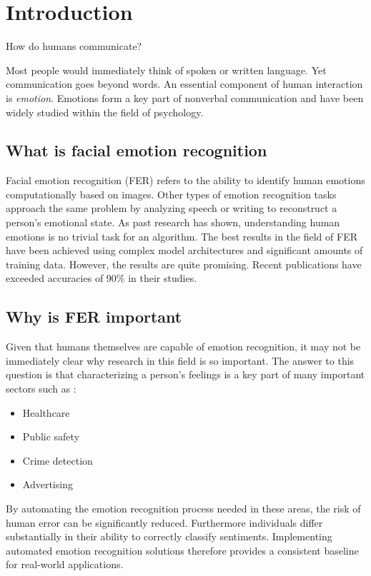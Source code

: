 \section{Introduction}
\label{sec:introduction}

How do humans communicate?

Most people would immediately think of spoken or written language. Yet communication goes beyond words.
An essential component of human interaction is \textit{emotion}. Emotions form a key part of nonverbal communication and have been
widely studied within the field of psychology.

\subsection{What is facial emotion recognition}

Facial emotion recognition (FER) refers to the ability to identify human emotions computationally based on images. Other types of emotion recognition tasks 
approach the same problem by analyzing speech or writing to reconstruct a person's emotional state. As past research has shown, understanding human emotions 
is no trivial task for an algorithm. The best results in the field of FER have been achieved using complex model architectures and significant amounts of training
data. However, the results are quite promising. Recent publications have exceeded accuracies of 90\% \cite{HSU2025112867} in their studies.

\subsection{Why is FER important}

Given that humans themselves are capable of emotion recognition, it may not be immediately clear why research in this field is so important. The answer
to this question is that characterizing a person's feelings is a key part of many important sectors such as \cite{europa}:

\begin{itemize}
    \item Healthcare
    \item Public safety
    \item Crime detection
    \item Advertising
\end{itemize}


By automating the emotion recognition process needed in these areas, the risk of human error can be significantly reduced. Furthermore individuals 
differ substantially in their ability to correctly classify sentiments. Implementing automated emotion recognition solutions therefore provides a
consistent baseline for real-world applications.

